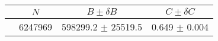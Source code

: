 \begin{tabular}{lccc}
\hline
    &   $N$   & $B \pm \delta B$  &  $C \pm \delta C$ \\
\hline
                               & 6247969    & 598299.2   $\pm$ 25519.5 & 0.649      $\pm$ 0.004 \\
\hline
\end{tabular}
